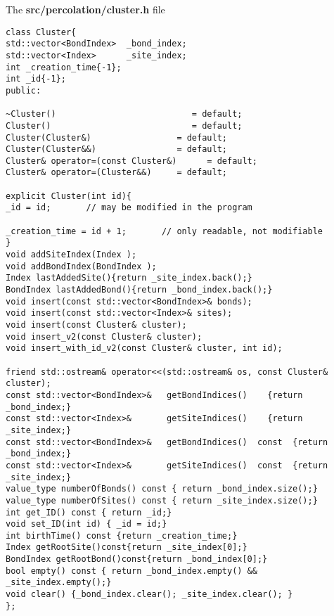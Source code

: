 
The \textbf{src/percolation/cluster.h} file

\begin{lstlisting}[style=CStyle]
class Cluster{
std::vector<BondIndex>  _bond_index; 
std::vector<Index>      _site_index; 
int _creation_time{-1};  
int _id{-1};
public:

~Cluster()                           = default;
Cluster()                            = default;
Cluster(Cluster&)                 = default;
Cluster(Cluster&&)                = default;
Cluster& operator=(const Cluster&)      = default;
Cluster& operator=(Cluster&&)     = default;

explicit Cluster(int id){
_id = id;       // may be modified in the program

_creation_time = id + 1;       // only readable, not modifiable
}
void addSiteIndex(Index );
void addBondIndex(BondIndex );
Index lastAddedSite(){return _site_index.back();}
BondIndex lastAddedBond(){return _bond_index.back();}
void insert(const std::vector<BondIndex>& bonds);
void insert(const std::vector<Index>& sites);
void insert(const Cluster& cluster);
void insert_v2(const Cluster& cluster);
void insert_with_id_v2(const Cluster& cluster, int id);

friend std::ostream& operator<<(std::ostream& os, const Cluster& cluster);
const std::vector<BondIndex>&   getBondIndices()    {return _bond_index;}
const std::vector<Index>&       getSiteIndices()    {return _site_index;}
const std::vector<BondIndex>&   getBondIndices()  const  {return _bond_index;}
const std::vector<Index>&       getSiteIndices()  const  {return _site_index;}
value_type numberOfBonds() const { return _bond_index.size();}
value_type numberOfSites() const { return _site_index.size();}
int get_ID() const { return _id;}
void set_ID(int id) { _id = id;}
int birthTime() const {return _creation_time;}
Index getRootSite()const{return _site_index[0];} 
BondIndex getRootBond()const{return _bond_index[0];} 
bool empty() const { return _bond_index.empty() && _site_index.empty();}
void clear() {_bond_index.clear(); _site_index.clear(); }
};
\end{lstlisting}
